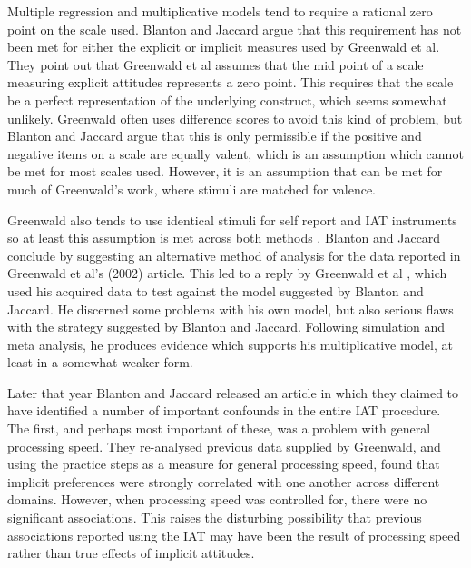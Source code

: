 Multiple regression and multiplicative models tend to require a rational zero point on the scale used. Blanton and Jaccard argue that this requirement has not been met for either the explicit or implicit measures used by Greenwald et al. They point out that Greenwald et al \cite{greenwald2002} assumes that the mid point of a scale measuring explicit attitudes represents a zero point. This requires that the scale be a perfect representation of the underlying construct, which seems somewhat unlikely. Greenwald often uses difference scores to avoid this kind of problem, but Blanton and Jaccard argue that this is only permissible if the positive and negative items on a scale are equally valent, which is an assumption which cannot be met for most scales used. However, it is an assumption that can be met for much of Greenwald's work, where stimuli are matched for valence. 

Greenwald also tends to use identical stimuli for self report and IAT instruments so at least this assumption is met across both methods \cite{Farnham1999,Greenwald1998}. Blanton and Jaccard conclude by suggesting an alternative method of analysis for the data reported in Greenwald et al's (2002) article. This led to a reply by Greenwald et al \cite{Greenwald2006b}, which used his acquired data to test against the model suggested by Blanton and Jaccard. He discerned some problems with his own model, but also serious flaws with the strategy suggested by Blanton and Jaccard. Following simulation and meta analysis, he produces evidence which supports his multiplicative model, at least in a somewhat weaker form. 

Later that year Blanton and Jaccard released an article \cite{Blanton2006} in which they claimed to have identified a number of important confounds in the entire IAT procedure. The first, and perhaps most important of these, was a problem with general processing speed. They re-analysed previous data supplied by Greenwald, and using the practice steps as a measure for general processing speed, found that implicit preferences were strongly correlated with one another across different domains. However, when processing speed was controlled for, there were no significant associations. This raises the disturbing possibility that previous associations reported using the IAT may have been the result of processing speed rather than true effects of implicit attitudes. 

